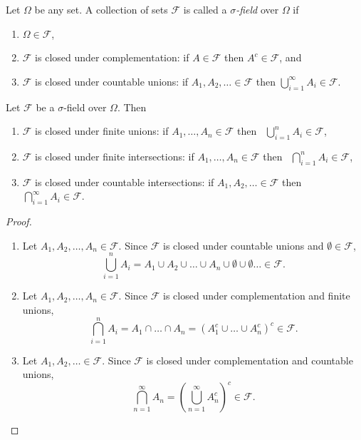 \documentclass[lecture]{csm}
\def\it{\item}
\def\ben{\begin{enumerate}}
\def\een{\end{enumerate}}
\begin{document}
\begin{definition}
Let $\Omega$ be any set. A collection of sets $\mathcal{F}$ is called a \emph{$\sigma$-field} over $\Omega$ if 
\ben
\it $\Omega\in\mathcal{F}$,
\it $\mathcal{F}$ is closed under complementation: if $A\in\mathcal{F}$ then $A^c\in\mathcal{F}$, and
\it $\mathcal{F}$ is closed under countable unions: if $A_1,A_2,\ldots\in\mathcal{F}$ then $\bigcup_{i=1}^{\infty}A_i \in\mathcal{F}$.
\een
\end{definition}


\begin{theorem}\label{thm:properties_of_sigma_fields}
Let $\mathcal{F}$ be a $\sigma$-field over $\Omega$. Then
\ben
\it $\mathcal{F}$ is closed under finite unions: if $A_1,\ldots,A_n\in\mathcal{F}$ then \ $\bigcup_{i=1}^{n}A_i\in\mathcal{F}$,
\it $\mathcal{F}$ is closed under finite intersections: if $A_1,\ldots,A_n\in\mathcal{F}$ then \ $\bigcap_{i=1}^{n}A_i\in\mathcal{F}$,
\it $\mathcal{F}$ is closed under countable intersections: if $A_1,A_2,\ldots\in\mathcal{F}$ then \ $\bigcap_{i=1}^{\infty}A_i \in\mathcal{F}$.
\een
\end{theorem}

\begin{proof}
\ben
\it 
Let $A_1,A_2,\ldots,A_n\in\mathcal{F}$. Since $\mathcal{F}$ is closed under countable unions and $\emptyset\in\mathcal{F}$, 
\[
\bigcup_{i=1}^n A_i = A_1\cup A_2\cup\ldots\cup A_n\cup\emptyset\cup\emptyset\ldots \in\mathcal{F}.
\]
\it
Let $A_1,A_2,\ldots,A_n\in\mathcal{F}$. Since $\mathcal{F}$ is closed under complementation and finite unions,
\[
\bigcap_{i=1}^n A_i = A_1\cap\ldots\cap A_n = (A^c_1\cup\ldots\cup A^c_n)^c \in\mathcal{F}.
\]
\it
Let $A_1,A_2,\ldots\in\mathcal{F}$. Since $\mathcal{F}$ is closed under complementation and countable unions,
\[
\bigcap_{n=1}^{\infty} A_n = \left(\bigcup_{n=1}^{\infty} A^c_n\right)^c \in\mathcal{F}.
\] 
\een
\end{proof}


\end{document}
